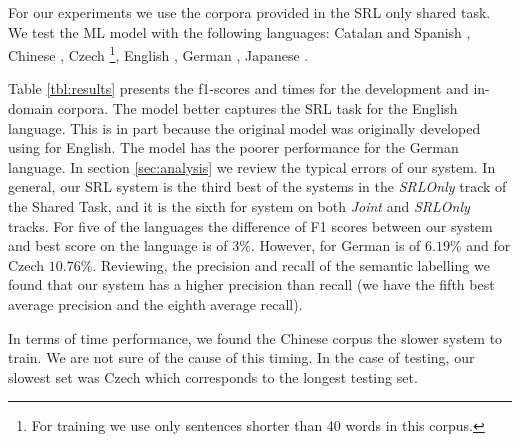 For our experiments we use the corpora provided in the SRL only shared task. We 
test the ML model with the following languages: Catalan and Spanish 
\citep{catalan-and-spanish-data} , Chinese \citep{chinese-data}, Czech 
\citep{czech-data}\footnote{For training we use only sentences shorter than 40 
words in this corpus.}, English \citep{english-data}, German 
\citep{german-data}, Japanese \citep{japanese-data}. 

Table \ref{tbl:results} presents the f1-scores and times for the development and
in-domain corpora. The model better captures the SRL task for the English 
language. This is in part because the original model was originally developed 
using for English. The model has the poorer performance for the German language.  
In section \ref{sec:analysis} we review the typical errors of our system. In 
general, our SRL system is the third best of the systems in the \emph{SRLOnly} 
track of the Shared Task, and it is the sixth for system on both \emph{Joint} 
and \emph{SRLOnly} tracks. For five of the languages the difference of F1 scores 
between our system and best score on the language is of $3\%$.  However, for 
German is of  $6.19\%$ and for Czech $10.76\%$.  Reviewing, the precision and 
recall of the semantic labelling we found that our system has a higher precision 
than recall (we have the fifth best average precision and the eighth average 
recall).

In terms of time performance, we found the Chinese corpus the slower system to 
train. We are not sure of the cause of this timing. In the case of testing, our 
slowest set was Czech which corresponds to the longest testing set. 

